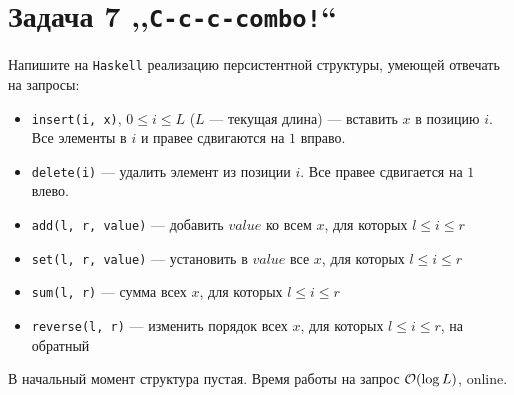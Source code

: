 \section{Задача 7 ,,\texttt{C-c-c-combo!}``}

Напишите на \texttt{Haskell} реализацию персистентной структуры,
умеющей отвечать на запросы:
\begin{itemize}
    \item \texttt{insert(i, x)}, $0 \le i \le L$ ($L$ --- текущая длина) --- вставить $x$ в позицию $i$. Все элементы в $i$ и правее сдвигаются на $1$ вправо.
    \item \texttt{delete(i)} --- удалить элемент из позиции $i$. Все правее сдвигается на $1$ влево.
    \item \texttt{add(l, r, value)} --- добавить $value$ ко всем $x$, для которых $l \le i \le r$
    \item \texttt{set(l, r, value)} --- установить в $value$ все $x$, для которых $l \le i \le r$
    \item \texttt{sum(l, r)} --- сумма всех $x$, для которых $l \le i \le r$
    \item \texttt{reverse(l, r)} --- изменить порядок всех $x$, для которых $l \le i \le r$, на обратный
\end{itemize}

В начальный момент структура пустая. Время работы на запрос $\mathcal{O}(\log{L})$, online.

